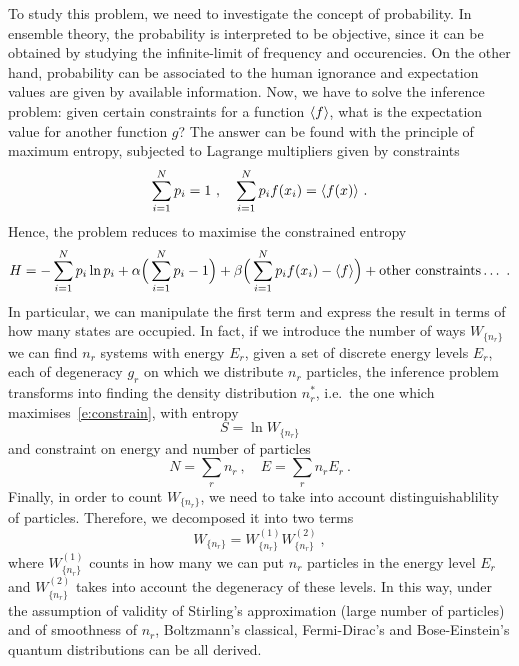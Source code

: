     To study this problem, we need to investigate the concept of probability. In ensemble theory, the probability is interpreted to be objective, since it can be obtained by studying the infinite-limit of frequency and occurencies. On the other hand, probability can be associated to the human ignorance and expectation values are given by available information. Now, we have to solve the inference problem: given certain constraints for a function $\langle f\rangle$, what is the expectation value for another function $g$? The answer can be found with the principle of maximum entropy, subjected to Lagrange multipliers given by constraints 
    \begin{equation*}
        \sum_{i=1}^{N} p_i = 1 ~, \quad \sum_{i=1}^{N} p_i f(x_i) = \langle f(x)\rangle ~.
    \end{equation*}
    Hence, the problem reduces to maximise the constrained entropy
    \begin{equation}\label{e:constrain}
        H = - \sum_{i=1}^{N} p_i \ln p_i + \alpha \Big( \sum_{i=1}^{N} p_i - 1 \Big) + \beta \Big( \sum_{i=1}^{N} p_i f(x_i) - \langle f\rangle \Big) + \text{other constraints} \ldots~.
    \end{equation}
    In particular, we can manipulate the first term and express the result in terms of how many states are occupied. In fact, if we introduce the number of ways $W_{\{n_r\}}$ we can find $n_r$ systems with energy $E_r$, given a set of discrete energy levels $E_r$, each of degeneracy $g_r$ on which we distribute $n_r$ particles, the inference problem transforms into finding the density distribution $n_r^*$, i.e.~the one which maximises~\eqref{e:constrain}, with entropy
    \begin{equation}\label{e:shannon2}
        S = \ln W_{\{n_r\}}
    \end{equation} 
    and constraint on energy and number of particles
    \begin{equation*}
        N = \sum_{r} n_r ~, \quad E = \sum_r n_r E_r ~.
    \end{equation*}
    Finally, in order to count $W_{\{n_r\}}$, we need to take into account distinguishablility of particles. Therefore, we decomposed it into two terms
    \begin{equation}\label{e:count}
        W_{\{n_r\}} = W_{\{n_r\}}^{(1)} W_{\{n_r\}}^{(2)} ~,
    \end{equation}
    where $W_{\{n_r\}}^{(1)}$ counts in how many we can put $n_r$ particles in the energy level $E_r$ and $W_{\{n_r\}}^{(2)}$ takes into account the degeneracy of these levels. In this way, under the assumption of validity of Stirling's approximation (large number of particles) and of smoothness of $n_r$, Boltzmann's classical, Fermi-Dirac's and Bose-Einstein's quantum distributions can be all derived.

